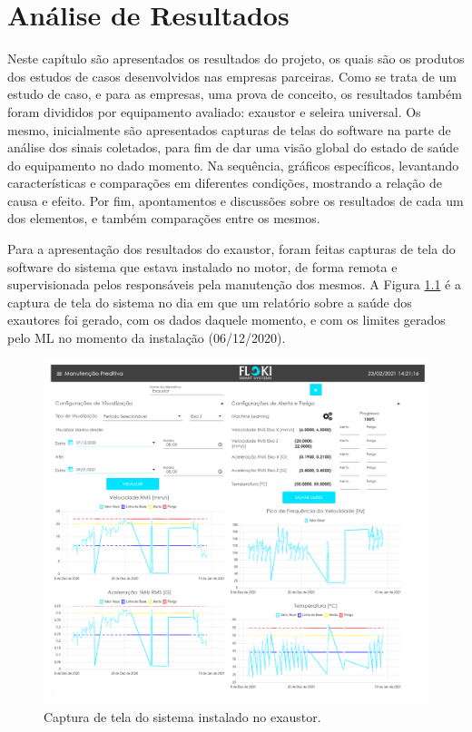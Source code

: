 
\chapter{Análise de Resultados}

Neste capítulo são apresentados os resultados do projeto, os quais são os produtos dos estudos de casos desenvolvidos nas empresas parceiras.
Como se trata de um estudo de caso, e para as empresas, uma prova de conceito, os resultados também foram divididos por equipamento avaliado:
exaustor e seleira universal. Os mesmo, inicialmente são apresentados capturas de telas do software na parte de análise dos sinais coletados, para fim
de dar uma visão global do estado de saúde do equipamento no dado momento. Na sequência, gráficos específicos, levantando características e 
comparações em diferentes condições, mostrando a relação de causa e efeito. Por fim, apontamentos e discussões sobre os resultados de cada um
dos elementos, e também comparações entre os mesmos.

Para a apresentação dos resultados do exaustor, foram feitas capturas de tela do software do sistema que estava instalado no motor, de forma
remota e supervisionada pelos responsáveis pela manutenção dos mesmos. A Figura \ref{fig:exaustor_1} é a captura de tela do sistema no dia
em que um relatório sobre a saúde dos exautores foi gerado, com os dados daquele momento, e com os limites gerados pelo ML
no momento da instalação (06/12/2020).

\begin{figure}[H]
    \caption{Captura de tela do sistema instalado no exaustor.}
    \begin{center}
        \includegraphics[scale=0.95, page=1]{resultados/img/resultados.pdf}
    \end{center}
    \label{fig:exaustor_1}
\end{figure}


